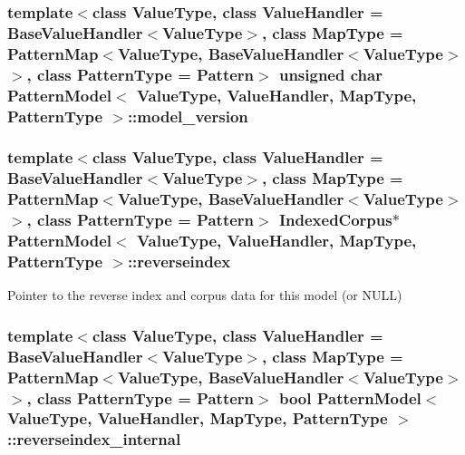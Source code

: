 \subsubsection[{model\+\_\+version}]{\setlength{\rightskip}{0pt plus 5cm}template$<$class Value\+Type, class Value\+Handler = Base\+Value\+Handler$<$\+Value\+Type$>$, class Map\+Type = Pattern\+Map$<$\+Value\+Type, Base\+Value\+Handler$<$\+Value\+Type$>$$>$, class Pattern\+Type = Pattern$>$ unsigned char {\bf Pattern\+Model}$<$ Value\+Type, Value\+Handler, Map\+Type, {\bf Pattern\+Type} $>$\+::model\+\_\+version\hspace{0.3cm}{\ttfamily [protected]}}\label{classPatternModel_a512b5e8516c92983f95141d24d944f1d}
\hypertarget{classPatternModel_af816b73fbc0a1247f54fbb50593dce22}{}
\subsubsection[{reverseindex}]{\setlength{\rightskip}{0pt plus 5cm}template$<$class Value\+Type, class Value\+Handler = Base\+Value\+Handler$<$\+Value\+Type$>$, class Map\+Type = Pattern\+Map$<$\+Value\+Type, Base\+Value\+Handler$<$\+Value\+Type$>$$>$, class Pattern\+Type = Pattern$>$ {\bf Indexed\+Corpus}$\ast$ {\bf Pattern\+Model}$<$ Value\+Type, Value\+Handler, Map\+Type, {\bf Pattern\+Type} $>$\+::reverseindex}\label{classPatternModel_af816b73fbc0a1247f54fbb50593dce22}


Pointer to the reverse index and corpus data for this model (or N\+U\+L\+L) 

\hypertarget{classPatternModel_a42dc001ef7580e133518d4cc9164cad9}{}
\subsubsection[{reverseindex\+\_\+internal}]{\setlength{\rightskip}{0pt plus 5cm}template$<$class Value\+Type, class Value\+Handler = Base\+Value\+Handler$<$\+Value\+Type$>$, class Map\+Type = Pattern\+Map$<$\+Value\+Type, Base\+Value\+Handler$<$\+Value\+Type$>$$>$, class Pattern\+Type = Pattern$>$ bool {\bf Pattern\+Model}$<$ Value\+Type, Value\+Handler, Map\+Type, {\bf Pattern\+Type} $>$\+::reverseindex\+\_\+internal}\label{classPatternModel_a42dc001ef7580e133518d4cc9164cad9}
\hypertarget{classPatternModel_ada5d1db54c4e30a705aa13ce619e6d9a}{}
